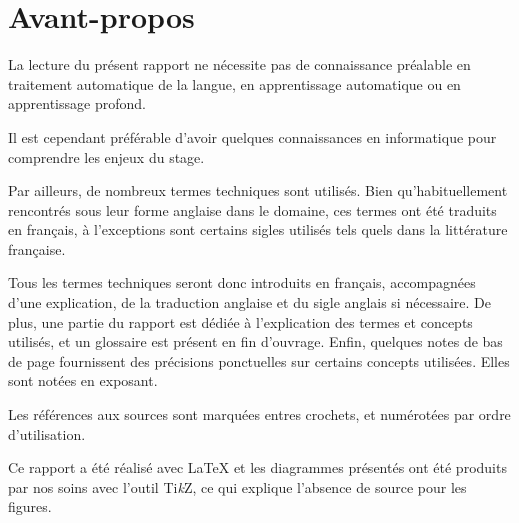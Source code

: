 \section*{Avant-propos} %
La lecture du présent rapport ne nécessite pas de connaissance préalable en traitement automatique de la langue, en apprentissage automatique ou en apprentissage profond.

Il est cependant préférable d'avoir quelques connaissances en informatique pour comprendre les enjeux du stage.

Par ailleurs, de nombreux termes techniques sont utilisés.
%
%
Bien qu'habituellement rencontrés sous leur forme anglaise dans le domaine, ces termes ont été traduits en français, à l'exceptions sont certains sigles utilisés tels quels dans la littérature française.

Tous les termes techniques seront donc introduits en français, accompagnées d'une explication, de la traduction anglaise et du sigle anglais si nécessaire.
%
%
De plus, une partie du rapport est dédiée à l'explication des termes et concepts utilisés, et un glossaire est présent en fin d'ouvrage.
%
%
%
Enfin, quelques notes de bas de page fournissent des précisions ponctuelles sur certains concepts utilisées. Elles sont notées en exposant. 

Les références aux sources sont marquées entres crochets, et numérotées par ordre d'utilisation.

Ce rapport a été réalisé avec \LaTeX{} et les diagrammes présentés ont été produits par nos soins avec l'outil Ti\textit{k}Z, ce qui explique l'absence de source pour les figures.